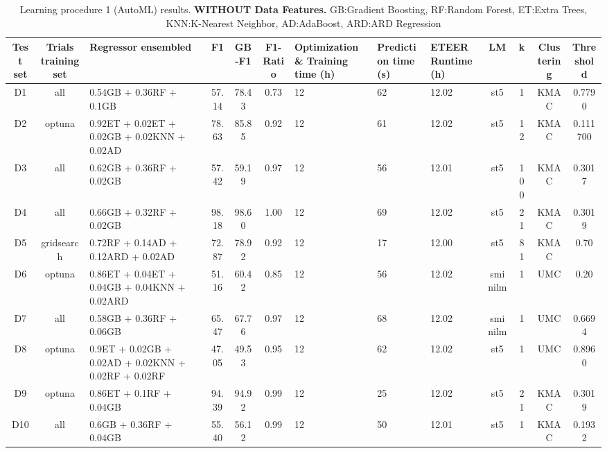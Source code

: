 \begin{table*}[ht!]
{\footnotesize
\begin{center}  
\caption{Learning procedure 1 (AutoML) results. \textbf{WITHOUT Data Features.} GB:Gradient Boosting, RF:Random Forest, ET:Extra Trees, KNN:K-Nearest Neighbor, AD:AdaBoost, ARD:ARD Regression } 
\label{tab:autosklearn-results}
\begin{tabular}{|c|c|p{2.5cm}|c|c|c|p{2cm}|p{1.0cm}|p{1.0cm}|c|c|c|c|}
\toprule
Test set & Trials training set & Regressor ensembled & F1 & GB-F1 & F1-Ratio & Optimization \& Training time (h) & Prediction time (s) & ETEER Runtime (h) & LM & k & Clustering & Threshold \\
\midrule
D1 & all & 0.54GB + 0.36RF + 0.1GB & 57.14 & 78.43 & 0.73 & 12 & 62 & 12.02 & st5 & 1 & KMAC & 0.7790 \\
D2 & optuna & 0.92ET + 0.02ET + 0.02GB + 0.02KNN + 0.02AD & 78.63 & 85.85 & 0.92 & 12 & 61 & 12.02 & st5 & 12 & KMAC & 0.111700 \\
D3 & all & 0.62GB + 0.36RF + 0.02GB & 57.42 & 59.19 & 0.97 & 12 & 56 & 12.01 & st5 & 100 & KMAC & 0.3017 \\
D4 & all & 0.66GB + 0.32RF + 0.02GB & 98.18 & 98.60 & 1.00 & 12 & 69 & 12.02 & st5 & 21 & KMAC & 0.3019 \\
D5 & gridsearch & 0.72RF + 0.14AD + 0.12ARD + 0.02AD & 72.87 & 78.92 & 0.92 & 12 & 17 & 12.00 & st5 & 81 & KMAC & 0.70 \\
D6 & optuna & 0.86ET + 0.04ET + 0.04GB + 0.04KNN + 0.02ARD & 51.16 & 60.42 & 0.85 & 12 & 56 & 12.02 & sminilm & 1 & UMC & 0.20 \\
D7 & all & 0.58GB + 0.36RF + 0.06GB & 65.47 & 67.76 & 0.97 & 12 & 68 & 12.02 & sminilm & 1 & UMC & 0.6694 \\
D8 & optuna & 0.9ET + 0.02GB + 0.02AD + 0.02KNN + 0.02RF + 0.02RF & 47.05 & 49.53 & 0.95 & 12 & 62 & 12.02 & st5 & 1 & UMC & 0.8960 \\
D9 & optuna & 0.86ET + 0.1RF + 0.04GB & 94.39 & 94.92 & 0.99 & 12 & 25 & 12.02 & st5 & 21 & KMAC & 0.3019 \\
D10 & all & 0.6GB + 0.36RF + 0.04GB & 55.40 & 56.12 & 0.99 & 12 & 50 & 12.01 & st5 & 1 & KMAC & 0.1932 \\
\bottomrule
\end{tabular}
\end{center}  
}
\end{table*}